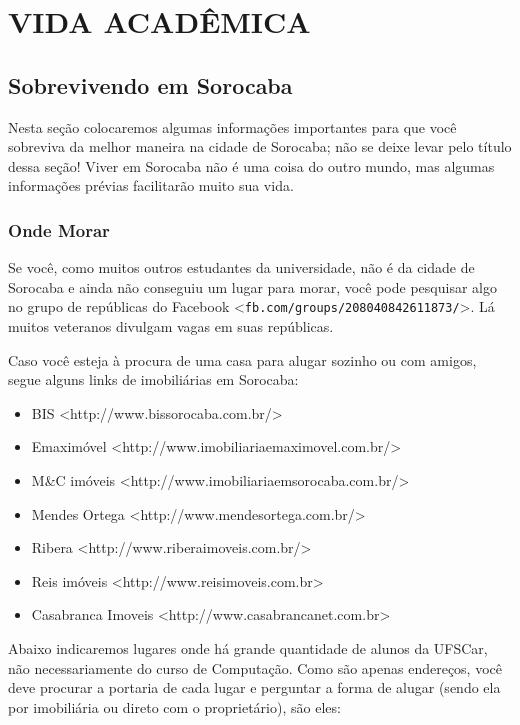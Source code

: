 \section{VIDA ACADÊMICA}
\subsection{Sobrevivendo em Sorocaba}
Nesta seção colocaremos algumas informações importantes para que você sobreviva da melhor maneira na cidade de Sorocaba; não se deixe levar pelo título dessa seção! Viver em Sorocaba não é uma coisa do outro mundo, mas algumas informações prévias facilitarão muito sua vida.

\subsubsection{Onde Morar}
Se você, como muitos outros estudantes da universidade, não é da cidade de Sorocaba e ainda não conseguiu um lugar para morar, você pode pesquisar algo no grupo de repúblicas do Facebook <\texttt{fb.com/groups/208040842611873/}>. Lá muitos veteranos divulgam vagas em suas repúblicas.

Caso você esteja à procura de uma casa para alugar sozinho ou com amigos, segue alguns links de imobiliárias em Sorocaba:

\begin{itemize}
  \item BIS <http://www.bissorocaba.com.br/>
  \item Emaximóvel <http://www.imobiliariaemaximovel.com.br/>
  \item M\&C imóveis <http://www.imobiliariaemsorocaba.com.br/>
  \item Mendes Ortega <http://www.mendesortega.com.br/>
  \item Ribera <http://www.riberaimoveis.com.br/>
  \item Reis imóveis <http://www.reisimoveis.com.br>
  \item Casabranca Imoveis <http://www.casabrancanet.com.br>
\end{itemize}

Abaixo indicaremos lugares onde há grande quantidade de alunos da UFSCar, não
necessariamente do curso de Computação. Como são apenas endereços, você deve
procurar a portaria de cada lugar e perguntar a forma de alugar (sendo ela por
imobiliária ou direto com o proprietário), são eles:

